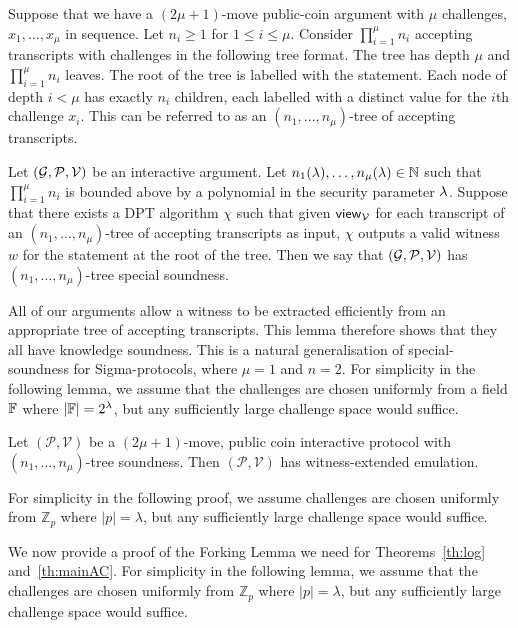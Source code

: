 Suppose that we have a $(2\mu+1)$-move public-coin argument with $\mu$ challenges, $x_1,\ldots,x_\mu$ in sequence. Let $n_i\geq 1$ for $1\leq i \leq \mu$.  Consider $\prod_{i=1}^\mu n_i$ accepting transcripts with challenges in the following tree format. The tree has depth $\mu$ and $\prod_{i=1}^\mu n_i$ leaves. The root of the tree is labelled with the statement. Each node of depth $i<\mu$ has exactly $n_i$ children, each labelled with a distinct value for the $i$th challenge $x_i$. This can be referred to as an $(n_1,\ldots,n_\mu)$-tree of accepting transcripts. 

\begin{definition}\label{def:treespecsound}
Let $(\mathcal{G},\mathcal{P},\mathcal{V})$ be an interactive argument. Let $n_1(\lambda),\ldots,n_\mu(\lambda) \in \mathbb{N}$ such that $\prod_{i=1}^\mu n_i$ is bounded above by a polynomial in the security parameter $\lambda$. Suppose that there exists a DPT algorithm $\chi$ such that given $\mathsf{view}_{\mathcal{V}}$ for each transcript of an $(n_1,\ldots,n_\mu)$-tree of accepting transcripts as input, $\chi$ outputs a valid witness $w$ for the statement at the root of the tree. Then we say that $(\mathcal{G},\mathcal{P},\mathcal{V})$ has $(n_1,\ldots,n_\mu)$-tree special soundness.
\end{definition}

All of our arguments allow a witness to be extracted efficiently from an appropriate tree of accepting transcripts. This lemma therefore shows that they all have knowledge soundness. This is a natural generalisation of special-soundness for Sigma-protocols, where $\mu=1$ and $n=2$.  For simplicity in the following lemma, we assume that the challenges are chosen uniformly from a field $\mathbb{F}$ where $\left| \mathbb{F} \right| = 2^{\lambda}$, but any sufficiently large challenge space would suffice.

\begin{lemma}\label{lem:fork}
Let $(\mathcal{P},\mathcal{V})$ be a $(2\mu+1)$-move, public coin interactive protocol with $(n_1,\ldots,n_\mu)$-tree soundness. Then $(\mathcal{P},\mathcal{V})$ has witness-extended emulation. 
\end{lemma}
For simplicity in the following proof, we assume challenges are chosen uniformly from $\mathbb{Z}_p$ where $\left| p \right| = \lambda$, but any sufficiently large challenge space would suffice.

We now provide a proof of the Forking Lemma we need for Theorems~\ref{th:log} and~\ref{th:mainAC}. 
For simplicity in the following lemma, we assume that the challenges are chosen uniformly from $\mathbb{Z}_p$ where $\left| p \right| = \lambda$, but any sufficiently large challenge space would suffice.


